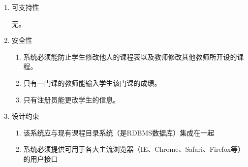 \begin{enumerate}
  \item 可支持性
  
  \CJKindent 无。
  
  \item 安全性
  
  \begin{enumerate}
    \item 系统必须能防止学生修改他人的课程表以及教师修改其他教师所开设的课程。
    \item 只有一门课的教师能输入学生该门课的成绩。
    \item 只有注册员能更改学生的信息。
  \end{enumerate}
  
  \item 设计约束
  
  \begin{enumerate}
    \item 该系统应与现有课程目录系统（是RDBMS数据库）集成在一起
    \item 系统必须提供可用于各大主流浏览器（IE、Chrome、Safari、Firefox等）的用户接口
  \end{enumerate}
\end{enumerate}

